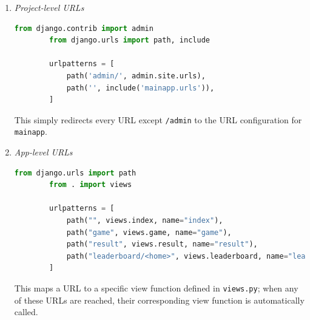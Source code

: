 \documentclass[12pt, a4paper]{report}
\begin{document}
    \begin{enumerate}
        \item \textit{Project-level URLs}\\
        \begin{lstlisting}[language=Python, caption=sudoku/urls.py]
        from django.contrib import admin
        from django.urls import path, include
        
        urlpatterns = [
            path('admin/', admin.site.urls),
            path('', include('mainapp.urls')),
        ]
        \end{lstlisting}
        This simply redirects every URL except \texttt{/admin} to the URL configuration for \texttt{mainapp}.
        \item \textit{App-level URLs}
        \begin{lstlisting}[language=Python, caption=mainapp/urls.py]
        from django.urls import path
        from . import views
        
        urlpatterns = [
            path("", views.index, name="index"),
            path("game", views.game, name="game"),
            path("result", views.result, name="result"),
            path("leaderboard/<home>", views.leaderboard, name="leaderboard")
        ]
        \end{lstlisting}
        This maps a URL to a specific view function defined in \texttt{views.py}; when any of these URLs are reached, their corresponding view function is automatically called.
    \end{enumerate}
    
    
    
    
    
\end{document}
